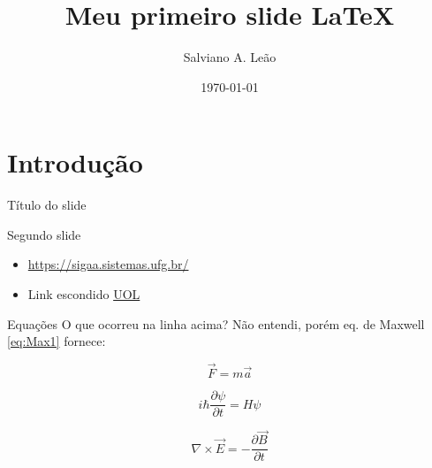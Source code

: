 \documentclass[style=sailor,clock,mode=present]{powerdot}
\title{Meu primeiro slide LaTeX}
\author{Salviano A. Leão}
\date{\today}
\begin{document}
\maketitle

\section{Introdução}

\begin{slide}{Título do slide}
\lipsum[1]
\end{slide}



\begin{slide}[toc=]{Segundo slide}
\begin{itemize}
   \item \url{https://sigaa.sistemas.ufg.br/}

   \item Link escondido \href{https://www.uol.com.br/}{UOL}
\end{itemize}

\end{slide}

\begin{slide}{Equações}
O que ocorreu na linha acima? Não entendi, porém 
eq. de Maxwell \ref{eq:Max1} fornece:

\begin{equation}\label{eq:2LN} 
 \vec{F} = m \vec{a}
\end{equation} 


\begin{equation}\label{eq:Sch} 
 i \hbar \frac{\partial \psi}{\partial t} = H \psi
\end{equation} 


\begin{equation}\label{eq:Max1} 
 \nabla \times \vec{E} = - \frac{\partial \vec{B}}{\partial t}
\end{equation} 

\end{slide}
\end{document}
